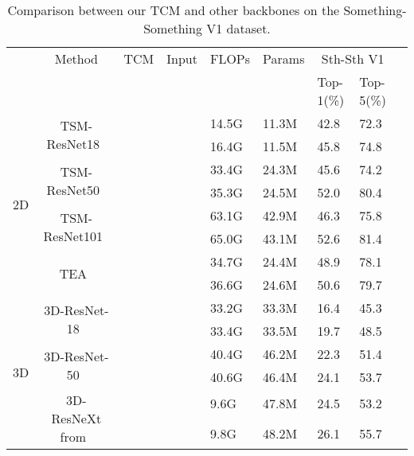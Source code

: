 \documentclass[journal]{IEEEtran}
\begin{document}
\begin{table*}[!ht]
\centering
\caption{Comparison between our TCM and other backbones on the Something-Something V1 dataset.}
\label{tab:diff_backbones}
\begin{tabular}{lccclllll}
\hline
                      & Method       & TCM          & Input & FLOPs            & Params   & \multicolumn{2}{c}{Sth-Sth V1}  \\
                             &                &              &       &                  &         & Top-1(\%)  & Top-5(\%)         \\ \hline
\multirow{8}{*}{2D}  & \multirow{2}{*}{TSM-ResNet18~\cite{wang2016temporal} }      &          &      & 14.5G    & 11.3M   & 42.8           & 72.3                \\
                             &                &  &    & 16.4G    & 11.5M   & 45.8  & 74.8 \\ \cline{2-8}
                             & \multirow{2}{*}{TSM-ResNet50~\cite{wang2016temporal}}      &         &      & 33.4G    & 24.3M   & 45.6           & 74.2                \\
                             &                &  &    & 35.3G    & 24.5M   & 52.0  & 80.4 \\ \cline{2-8}
                             & \multirow{2}{*}{TSM-ResNet101~\cite{wang2016temporal}}     &     &      & 63.1G    & 42.9M   & 46.3           & 75.8                \\
                             &                &  &    & 65.0G    & 43.1M   & 52.6  & 81.4 \\ \cline{2-8}
  & \multirow{2}{*}{TEA~\cite{zhou2018temporal}}     &   &      & 34.7G    & 24.4M      & 48.9       &  78.1               \\
                             &                &  &      & 36.6G  & 24.6M   & 50.6   & 79.7  \\ \hline
\multirow{8}{*}{3D}
&\multirow{2}{*}{3D-ResNet-18~\cite{hara2018can}}    &      &     & 33.2G    & 33.3M    & 16.4       & 45.3                        \\
                             &                &  &      & 33.4G    & 33.5M   &19.7   & 48.5    \\ \cline{2-8}
&\multirow{2}{*}{3D-ResNet-50~\cite{hara2018can}} &     &     & 40.4G    & 46.2M    & 22.3       & 51.4                        \\
                             &                &  &      & 40.6G    & 46.4M   &24.1   & 53.7    \\ \cline{2-8}
&\multirow{2}{*}{3D-ResNeXt from~\cite{crasto2019mars}}  &     &     & 9.6G    & 47.8M    & 24.5       & 53.2                        \\
                             &                &  &      & 9.8G    & 48.2M   &26.1   & 55.7    \\ \hline

\end{tabular}
\end{table*}
\end{document}
